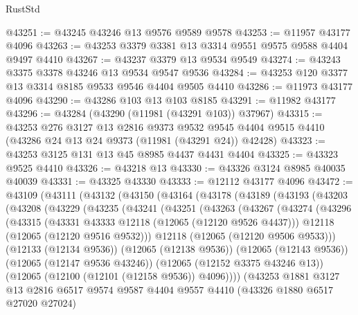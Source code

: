 \begin{lexlean}{RustStd}
\begin{coremodule}
@43251 := @43245 @43246 @13 @9576 @9589 @9578
@43253 := @11957 @43177 @4096
@43263 := @43253 @3379 @3381 @13 @3314 @9551 @9575 @9588 @4404 @9497 @4410
@43267 := @43237 @3379 @13 @9534 @9549
@43274 := @43243 @3375 @3378 @43246 @13 @9534 @9547 @9536
@43284 := @43253 @120 @3377 @13 @3314 @8185 @9533 @9546 @4404 @9505 @4410
@43286 := @11973 @43177 @4096
@43290 := @43286 @103 @13 @103 @8185
@43291 := @11982 @43177
@43296 := @43284 (@43290 (@11981 (@43291 @103)) @37967)
@43315 := @43253
    @276
    @3127
    @13
    @2816
    @9373
    @9532
    @9545
    @4404
    @9515
    @4410
    (@43286 @24 @13 @24 @9373 (@11981 (@43291 @24)) @42428)
@43323 := @43253 @3125 @131 @13 @45 @8985 @4437 @4431 @4404
@43325 := @43323 @9525 @4410
@43326 := @43218 @13
@43330 := @43326 @3124 @8985 @40035 @40039
@43331 := @43325 @43330
@43333 := @12112 @43177 @4096
@43472 := @43109
    (@43111
      (@43132
        (@43150
          (@43164
            (@43178
              (@43189
                (@43193
                  (@43203
                    (@43208
                      (@43229
                        (@43235
                          (@43241
                            (@43251
                              (@43263
                                (@43267
                                  (@43274
                                    (@43296
                                      (@43315
                                        (@43331 @43333 @12118 (@12065 (@12120 @9526 @4437)))
                                        @12118
                                        (@12065 (@12120 @9516 @9532)))
                                      @12118
                                      (@12065 (@12120 @9506 @9533)))
                                    (@12133 (@12134 @9536))
                                    (@12065 (@12138 @9536))
                                    (@12065 (@12143 @9536))
                                    (@12065 (@12147 @9536 @43246))
                                    (@12065 (@12152 @3375 @43246 @13))
                                    (@12065 (@12100 (@12101 (@12158 @9536)) @4096))))
                                (@43253
                                  @1881
                                  @3127
                                  @13
                                  @2816
                                  @6517
                                  @9574
                                  @9587
                                  @4404
                                  @9557
                                  @4410
                                  (@43326 @1880 @6517 @27020 @27024)

\end{coremodule}
\end{lexlean}
